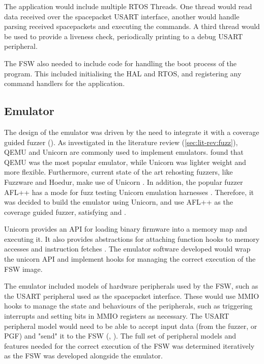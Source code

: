 \documentclass[../report.tex]{subfiles}
\begin{document}
The application would include multiple RTOS Threads. One thread would read data
received over the spacepacket USART interface, another would handle parsing
received spacepackets and executing the commands. A third thread would be used
to provide a liveness check, periodically printing to a debug USART peripheral.

The FSW also needed to include code for handling the boot process of the
program. This included initialising the HAL and RTOS, and registering any
command handlers for the application.

\subsection{Emulator}



The design of the emulator was driven by the need to integrate it with a
coverage guided fuzzer (). As investigated in the literature
review (\autoref{sec:lit-rev:fuzz}), QEMU and Unicorn are commonly used to
implement emulators. \citet{Yun_2022} found that QEMU was the most popular
emulator, while Unicorn was lighter weight and more flexible. Furthermore,
current state of the art rehosting fuzzers, like Fuzzware and Hoedur, make use
of Unicorn \citep{Fuzzware_2022, Hoedur_2023}. In addition, the popular fuzzer
AFL++ has a mode for fuzz testing Unicorn emulation harnesses
\citep{UnicornMode}. Therefore, it was decided to build the emulator using
Unicorn, and use AFL++ as the coverage guided fuzzer, satisfying
 and .

Unicorn provides an API for loading binary firmware into a memory map and
executing it. It also provides abstractions for attaching function hooks to
memory accesses and instruction fetches \citep{Unicorn}. The emulator software
developed would wrap the unicorn API and implement hooks for managing the
correct execution of the FSW image.

The emulator included models of hardware peripherals used by the FSW, such as
the USART peripheral used as the spacepacket interface. These would use MMIO
hooks to manage the state and behaviours of the peripherals, such as triggering
interrupts and setting bits in MMIO registers as necessary. The USART
peripheral model would need to be able to accept input data (from the fuzzer,
or PGF) and "send" it to the FSW (, ). The full set
of peripheral models and features needed for the correct execution of the FSW
was determined iteratively as the FSW was developed alongside the emulator.
\end{document}
